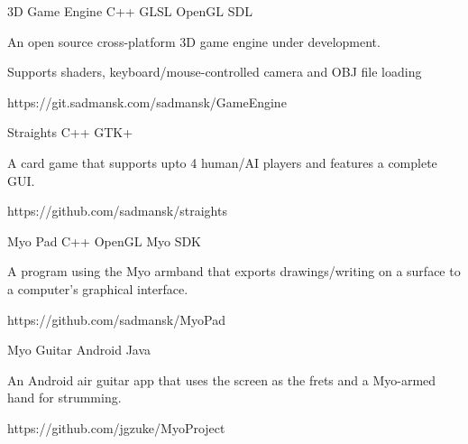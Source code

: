 



\begin{cvprojects}

\cvproject
{3D Game Engine}
{C++ \textbullet{} GLSL \textbullet{} OpenGL \textbullet{} SDL}
{
An open source cross-platform 3D game engine under development.
\begin{cvitems}
\item[]
\item {Supports shaders, keyboard/mouse-controlled camera and OBJ file loading}
\end{cvitems}
}
{https://git.sadmansk.com/sadmansk/GameEngine}


\cvproject
{Straights}
{C++ \textbullet{} GTK+}
{
    A card game that supports upto 4 human/AI players and features a complete GUI.
    \begin{cvitems}\end{cvitems} %
}
{https://github.com/sadmansk/straights}


\cvproject
{Myo Pad}
{C++ \textbullet{} OpenGL \textbullet{} Myo SDK}
{
A program using the Myo armband that exports drawings/writing on a surface to a computer's graphical interface.
    \begin{cvitems}\end{cvitems} %
}
{https://github.com/sadmansk/MyoPad}


\cvproject
{Myo Guitar}
{Android \textbullet{} Java}
{
An Android air guitar app that uses the screen as the frets and a Myo-armed hand for strumming.
    \begin{cvitems}\end{cvitems} %
}
{https://github.com/jgzuke/MyoProject}


\end{cvprojects}
